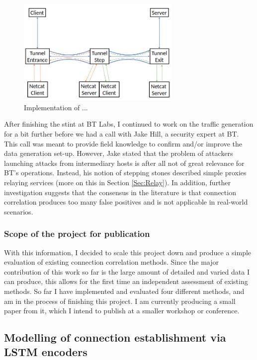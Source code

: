 \documentclass[a4paper,12pt,twoside]{article}
\begin{document}
\begin{figure}
\centering
\includegraphics[width=0.7\textwidth]{images/Step_stones.png}
\caption{Implementation of ...}\label{stepstone}
\end{figure}

After finishing the stint at BT Labs, I continued to work on the traffic generation for a bit further before we had a call with Jake Hill, a security expert at BT. This call was meant to provide field knowledge to confirm and/or improve the data generation set-up. However, Jake stated that the problem of attackers launching attacks from intermediary hosts is after all not of great relevance for BT's operations. Instead, his notion of stepping stones described simple proxies relaying services (more on this in Section \ref{Sec:Relay}). In addition, further investigation suggests that the consensus in the literature is that connection correlation produces too many false positives and is not applicable in real-world scenarios. 

\subsubsection{Scope of the project for publication}

With this information, I decided to scale this project down and produce a simple evaluation of existing connection correlation methods. Since the major contribution of this work so far is the large amount of detailed and varied data I can produce, this allows for the first time an independent assessment of existing methods. So far I have implemented and evaluated four different methods, and am in the process of finishing this project. I am currently producing a small paper from it, which I intend to publish at a smaller workshop or conference. 






\subsection{Modelling of connection establishment via LSTM encoders}\label{Sec:Encoder}
\end{document}
